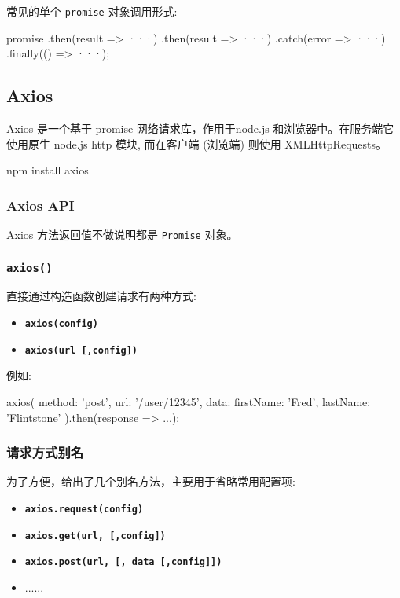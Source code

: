 常见的单个 \texttt{promise} 对象调用形式:

\begin{JavaScript}
promise
.then(result => {···})
.then(result => {···})
.catch(error => {···})
.finally(() => {···});
\end{JavaScript}

\subsection{Axios}

Axios 是一个基于 promise 网络请求库，作用于node.js 和浏览器中。在服务端它使用原生 node.js http 模块, 而在客户端 (浏览端) 则使用 XMLHttpRequests。

\begin{bash}
npm install axios
\end{bash}

\subsubsection{Axios API}

Axios 方法返回值不做说明都是 \texttt{Promise} 对象。

\subsubsection*{\texttt{axios()}}

直接通过构造函数创建请求有两种方式:
\begin{itemize}
  \item \textbf{\texttt{axios(config)}}
  \item \textbf{\texttt{axios(url [,config])}}
\end{itemize}

例如:
\begin{JavaScript}
axios({
  method: 'post',
  url: '/user/12345',
  data: {
    firstName: 'Fred',
    lastName: 'Flintstone'
  }
}).then(response => {...});
\end{JavaScript}

\subsubsection*{请求方式别名}

为了方便，给出了几个别名方法，主要用于省略常用配置项:

\begin{itemize}
  \item \textbf{\texttt{axios.request(config)}}
  \item \textbf{\texttt{axios.get(url, [,config])}}
  \item \textbf{\texttt{axios.post(url, [, data [,config]])}}
  \item ......
\end{itemize}

